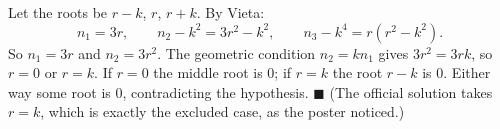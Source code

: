 Let the roots be $r-k$, $r$, $r+k$. By Vieta:
\[n_1=3r,\qquad n_2-k^2=3r^2-k^2,\qquad n_3-k^4=r\left(r^2-k^2\right).\]
So $n_1=3r$ and $n_2=3r^2$. The geometric condition $n_2=kn_1$ gives $3r^2=3rk$, so $r=0$ or $r=k$. If $r=0$ the middle root is $0$; if $r=k$ the root $r-k$ is $0$. Either way some root is $0$, contradicting the hypothesis. $\blacksquare$ (The official solution takes $r=k$, which is exactly the excluded case, as the poster noticed.)
